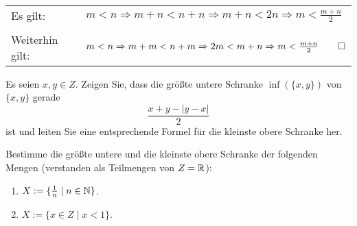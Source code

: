 \bigskip

\begin{lsg}[L\"osung~2]
	~\\[2ex]
	\begin{tabular}{ll}
		Es gilt: & $m<n \Rightarrow m+n<n+n \Rightarrow m+n<2n \Rightarrow m< \frac{m+n}{2}$ \\
		&\\
	Weiterhin gilt: & $m<n \Rightarrow m+m < n+m \Rightarrow 2m < m+n \Rightarrow m<\frac{m+n}{2} \qed$\\
	\end{tabular}



\end{lsg}


\bigskip


\begin{aufg}[6 Punkte]
Es seien $x,y\in Z$. Zeigen Sie, dass die gr\"o{\ss}te untere Schranke $\inf(\{x,y\})$ von $\{x,y\}$ gerade 
\[
\frac{x+y - |y-x|}{2}
\]
ist und leiten Sie eine entsprechende Formel f\"ur die kleinste obere Schranke her.
\end{aufg}


\bigskip

\begin{lsg}
\end{lsg}


\bigskip


\begin{aufg}[6 Punkte]
Bestimme die gr\"o{\ss}te untere und die kleinste obere Schranke der folgenden Mengen (verstanden als Teilmengen von $Z=\mathbb{R}$):
\begin{enumerate}[label=$\mathrm{(\roman*)}$, ref=$\mathrm{\roman*}$]
\item $X:=\{ \frac{1}{n} \mid n\in \mathbb{N}\}$.
\item $X:=\{ x \in Z \mid x < 1 \}$.
\end{enumerate}
\end{aufg}
 
\bigskip


